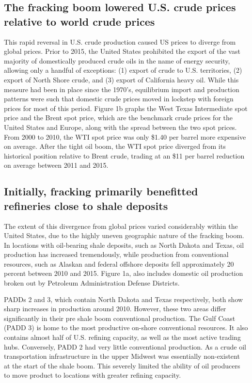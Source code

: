 \documentclass[12pt]{article}
\begin{document}
\subsection{The fracking boom lowered U.S. crude prices relative to world crude prices}

This rapid reversal in U.S. crude production caused US prices to diverge from global prices. Prior to 2015, the United States prohibited the export of the vast majority of domestically produced crude oils in the name of energy security, allowing only a handful of exceptions: (1) export of crude to U.S. territories, (2) export of North Shore crude, and (3) export of California heavy oil. While this measure had been in place since the 1970's, equilibrium import and production patterns were such that domestic crude prices moved in lockstep with foreign prices for most of this period. Figure 1b graphs the West Texas Intermediate spot price and the Brent spot price, which are the benchmark crude prices for the United States and Europe, along with the spread between the two spot prices. From 2000 to 2010, the WTI spot price was only \$1.40 per barrel more expensive on average. After the tight oil boom, the WTI spot price diverged from its historical position relative to Brent crude, trading at an \$11 per barrel reduction on average between 2011 and 2015.

\subsection{Initially, fracking primarily benefitted refineries close to shale deposits}

The extent of this divergence from global prices varied considerably within the United States, due to the highly uneven geographic nature of the fracking boom. In locations with oil-bearing shale deposits, such as North Dakota and Texas, oil production has increased tremendously, while production from conventional resources, such as Alaskan and federal offshore deposits fell approximately 20 percent between 2010 and 2015. Figure 1a, also includes domestic oil production broken out by Petroleum Administration Defense Districts.

PADDs 2 and 3, which contain North Dakota and Texas respectively, both show sharp increases in production around 2010. However, these two areas differ significantly in their pre shale boom conventional production. The Gulf Coast (PADD 3) is home to the most productive on-shore conventional resources. It also contains almost half of U.S. refining capacity, as well as the most active trading hubs. Conversely, PADD 2 had very little conventional production. As a crude oil transportation infrastructure in the upper Midwest was essentially non-existent at the start of the shale boom. This severely limited the ability of oil producers to move product to locations with greater refining capacity.
\end{document}
